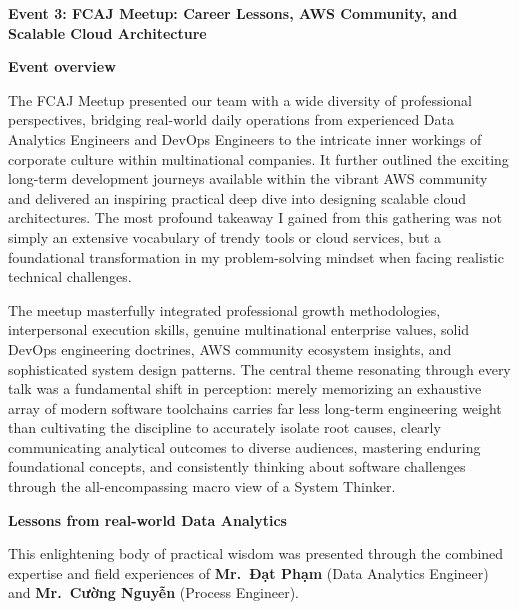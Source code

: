 \vspace{0.5em}\noindent\textbf{Event 3: FCAJ Meetup: Career Lessons, AWS Community, and
Scalable Cloud
Architecture}\par

\vspace{0.5em}\noindent\textbf{Event overview}\par

The FCAJ Meetup presented our team with a wide diversity of professional
perspectives, bridging real-world daily operations from experienced Data
Analytics Engineers and DevOps Engineers to the intricate inner workings
of corporate culture within multinational companies. It further outlined
the exciting long-term development journeys available within the vibrant
AWS community and delivered an inspiring practical deep dive into
designing scalable cloud architectures. The most profound takeaway I
gained from this gathering was not simply an extensive vocabulary of
trendy tools or cloud services, but a foundational transformation in my
problem-solving mindset when facing realistic technical challenges.

The meetup masterfully integrated professional growth methodologies,
interpersonal execution skills, genuine multinational enterprise values,
solid DevOps engineering doctrines, AWS community ecosystem insights,
and sophisticated system design patterns. The central theme resonating
through every talk was a fundamental shift in perception: merely
memorizing an exhaustive array of modern software toolchains carries far
less long-term engineering weight than cultivating the discipline to
accurately isolate root causes, clearly communicating analytical
outcomes to diverse audiences, mastering enduring foundational concepts,
and consistently thinking about software challenges through the
all-encompassing macro view of a System Thinker.

\vspace{0.5em}\noindent\textbf{Lessons from real-world Data
Analytics}\par

This enlightening body of practical wisdom was presented through the
combined expertise and field experiences of \textbf{Mr.~Đạt Phạm} (Data
Analytics Engineer) and \textbf{Mr.~Cường Nguyễn} (Process Engineer).

